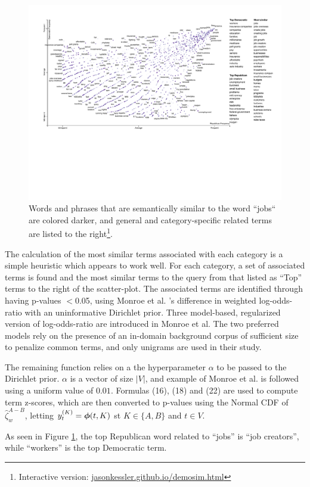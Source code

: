 \documentclass[11pt,a4paper]{article}
\begin{document}
\begin{figure}[h]
  \includegraphics[width=\linewidth]{similarity_scattertext}
  \caption{Words and phrases that are semantically similar to the word ``jobs`` are colored darker, and general and category-specific related terms are listed to the right\footnote{Interactive version: \href{https://jasonkessler.github.io/demosim.html}{jasonkessler.github.io/demosim.html}}.}
  \label{scattertextembeddings}
\vspace{-.2cm}
\end{figure}
The calculation of the most similar terms associated with each category is a simple heuristic which appears to work well.  For each category, a set of associated terms is found and the most similar terms to the query from that listed as ``Top'' terms to the right of the scatter-plot.  The associated terms are identified through having p-values $<$0.05, using Monroe et al. 's difference in weighted log-odds-ratio with an uninformative Dirichlet prior.  Three model-based, regularized version of log-odds-ratio are introduced in Monroe et al.  The two preferred models rely on the presence of an in-domain background corpus of sufficient size to penalize common terms, and only unigrams are used in their study.  

The remaining function relies on a the hyperparameter \mbox{\boldmath$\alpha$} to be passed to the Dirichlet prior.  \mbox{\boldmath$\alpha$} is a vector of size $|V|$, and example of Monroe et al. is followed using a uniform value of $0.01$.  Formulas (16), (18) and (22) are used to compute term z-scores, which are then converted to p-values using the Normal CDF of $\hat{\zeta}_{w}^{A-B}$, letting $y^{(K)}_{t} = \mbox{\boldmath$\phi$}(t,K)$ st ${K}\in{\{A,B\}}$ and $t\in{V}$.

As seen in Figure \ref{scattertextembeddings}, the top Republican word related to ``jobs'' is ``job creators'', while ``workers'' is the top Democratic term.

\vspace{-0.3cm}
\nocite{ggplot2}
\nocite{Rudder2014}
\nocite{tidytext}



\end{document}
